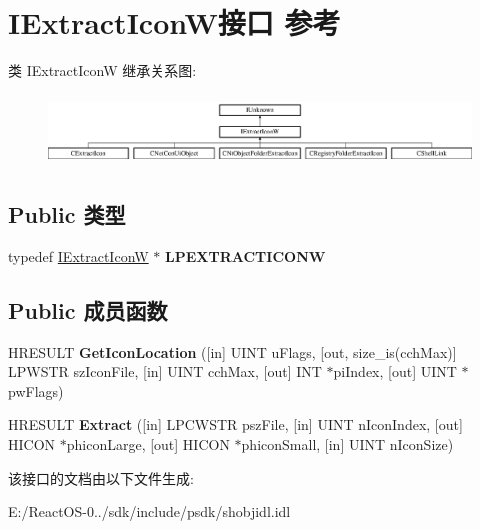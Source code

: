 \hypertarget{interface_i_extract_icon_w}{}\section{I\+Extract\+Icon\+W接口 参考}
\label{interface_i_extract_icon_w}
类 I\+Extract\+IconW 继承关系图\+:\begin{figure}[H]
\begin{center}
\leavevmode
\includegraphics[height=1.887640cm]{interface_i_extract_icon_w}
\end{center}
\end{figure}
\subsection*{Public 类型}
\begin{DoxyCompactItemize}
\item 
\mbox{\label{interface_i_extract_icon_w_a8475679eb63e1f652f4563f2c8dac4b7}} 
typedef \hyperlink{interface_i_extract_icon_w}{I\+Extract\+IconW} $\ast$ {\bfseries L\+P\+E\+X\+T\+R\+A\+C\+T\+I\+C\+O\+NW}
\end{DoxyCompactItemize}
\subsection*{Public 成员函数}
\begin{DoxyCompactItemize}
\item 
\mbox{\label{interface_i_extract_icon_w_a01759f123f4e9217e1ac9f9bbf3b6b77}} 
H\+R\+E\+S\+U\+LT {\bfseries Get\+Icon\+Location} (\mbox{[}in\mbox{]} U\+I\+NT u\+Flags, \mbox{[}out, size\+\_\+is(cch\+Max)\mbox{]} L\+P\+W\+S\+TR sz\+Icon\+File, \mbox{[}in\mbox{]} U\+I\+NT cch\+Max, \mbox{[}out\mbox{]} I\+NT $\ast$pi\+Index, \mbox{[}out\mbox{]} U\+I\+NT $\ast$pw\+Flags)
\item 
\mbox{\label{interface_i_extract_icon_w_ac9954df8cad18f7dfef8857d3f43568d}} 
H\+R\+E\+S\+U\+LT {\bfseries Extract} (\mbox{[}in\mbox{]} L\+P\+C\+W\+S\+TR psz\+File, \mbox{[}in\mbox{]} U\+I\+NT n\+Icon\+Index, \mbox{[}out\mbox{]} H\+I\+C\+ON $\ast$phicon\+Large, \mbox{[}out\mbox{]} H\+I\+C\+ON $\ast$phicon\+Small, \mbox{[}in\mbox{]} U\+I\+NT n\+Icon\+Size)
\end{DoxyCompactItemize}


该接口的文档由以下文件生成\+:\begin{DoxyCompactItemize}
\item 
E\+:/\+React\+O\+S-\/0../sdk/include/psdk/shobjidl.\+idl\end{DoxyCompactItemize}
